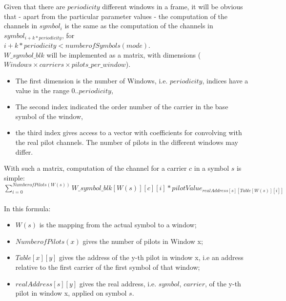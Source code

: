 \documentclass[11pt]{article}
\begin{document}
Given that there are $periodicity$ different windows in a frame,
it will be obvious that - apart from the particular parameter values -
the computation of the channels in $symbol_i$ is the same as the
computation of the channels in $symbol_{i + k * periodicity}$, for
\ \\
$i + k * periodicity < numberofSymbols (mode)$.
\ \\
$W\_symbol\_blk$ will be implemented as a matrix,
with dimensions ($Windows \times carriers \times pilots\_per\_window$).
\begin{itemize}
\item The first dimension is the number of Windows, i.e. $periodicity$,
indices have 
a value in the range $0 .. periodicity$,
\item The second index indicated the order number of the carrier in 
the base symbol of the window,
\item the third index gives access to a vector with
coefficients for convolving with the real pilot channels.
The number of pilots in the different windows may differ.
\end{itemize}
With such a matrix, computation of the channel for a carrier $c$ in a symbol $s$
is simple:
{
\ \\
$\sum_{i=0}^{NumberofPilots (W (s))} W\_symbol\_blk[W (s)][c][i] *
	           pilotValue_{realAddress [s][Table[W (s)][i]]}$
\ \\
}
In this formula:
\begin{itemize}
\item $W (s)$ is the mapping from the actual symbol to a window;
\item $NumberofPilots (x)$ gives the number of pilots in Window x;
\item $Table [x][y]$ gives the address of the y-th pilot in window x, i.e
an address relative to the first carrier of the first symbol of that window;
\item $realAddress [s][y]$  gives the real address, i.e. $symbol$, $carrier$,
of the y-th pilot in window x, applied on symbol $s$.
\end{itemize}
\end{document}
